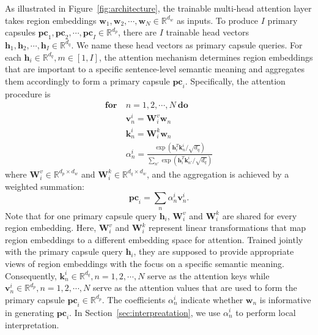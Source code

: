 \documentclass[10pt,journal,compsoc]{IEEEtran}
\begin{document}
As illustrated in Figure~\ref{fig:architecture}, the trainable multi-head attention layer takes region embeddings $\mathbf{w}_1, \mathbf{w}_2, \cdots, \mathbf{w}_N \in \mathbb{R}^{d_w}$ as inputs. To produce $I$ primary capsules $\mathbf{pc}_1, \mathbf{pc}_2, \cdots, \mathbf{pc}_I \in \mathbb{R}^{d_p}$, there are $I$ trainable head vectors $\mathbf{h}_1, \mathbf{h}_2, \cdots, \mathbf{h}_I \in \mathbb{R}^{d_q}$. We name these head vectors as primary capsule queries. For each $\mathbf{h}_i \in \mathbb{R}^{d_q}, m \in [1, I]$, the attention mechanism determines region embeddings that are important to a specific sentence-level semantic meaning and aggregates them accordingly to form a primary capsule $ \mathbf{pc}_i$. Specifically, the attention procedure is
\begin{align}
	\textbf{for}\ & n = 1,2,\cdots,N\ \textbf{do} \nonumber\\
	&\mathbf{v}^i_n = \mathbf{W}^v_i \mathbf{w}_n \\
	&\mathbf{k}^i_n = \mathbf{W}^k_i \mathbf{w}_n \\
	&\alpha^i_n = \frac{\exp({\mathbf{h}_i^T\mathbf{k}^i_n/\sqrt{d_q}})}{\sum_{n'}\exp({\mathbf{h}_i^T\mathbf{k}^i_{n'}/\sqrt{d_q}})} \label{eqn:attn_weights}
\end{align}
where $\mathbf{W}^v_i \in \mathbb{R}^{d_p \times d_w}$ and $\mathbf{W}^k_i \in \mathbb{R}^{d_q \times d_w}$, and the aggregation is achieved by a weighted summation:
\begin{equation}
	\mathbf{pc}_i = \sum_{n} \alpha^i_n \mathbf{v}^i_n.
\end{equation}
Note that for one primary capsule query $\mathbf{h}_i$, $\mathbf{W}^v_i$ and $\mathbf{W}^k_i$ are shared for every region embedding. Here, $\mathbf{W}^v_i$ and $\mathbf{W}^k_i$ represent linear transformations that map region embeddings to a different embedding space for attention. Trained jointly with the primary capsule query $\mathbf{h}_i$, they are supposed to provide appropriate views of region embeddings with the focus on a specific semantic meaning. Consequently, $\mathbf{k}^i_n \in \mathbb{R}^{d_q}, n = 1,2,\cdots,N$ serve as the attention keys while $\mathbf{v}^i_n \in \mathbb{R}^{d_p}, n = 1,2,\cdots,N$ serve as the attention values that are used to form the primary capsule $\mathbf{pc}_i \in \mathbb{R}^{d_p}$. The coefficients $\alpha^i_n$ indicate whether $\mathbf{w}_n$ is informative in generating $\mathbf{pc}_i$. In Section~\ref{sec:interpreatation}, we use $\alpha^i_n$ to perform local interpretation.
\end{document}
